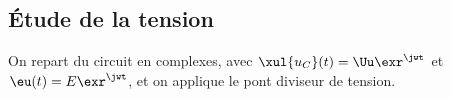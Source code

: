 \documentclass[../../main/main.tex]{subfiles}
\begin{document}
\begin{center}
\end{center}

\subsection{Étude de la tension}
On repart du circuit en complexes, avec $\xul{u_C}(t) = \Uu\exr^{\jwt}$ et
$\eu(t) = E\exr^{\jwt}$, et on applique le pont diviseur de tension.
\end{document}
